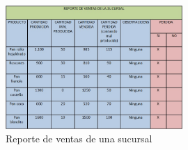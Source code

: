 \begin{figure}[htbp]
	\centering
		\includegraphics[width=0.60\textwidth]{images/REPORTEVENTASSUCURSAL.jpg}
	\caption{Reporte de ventas de una sucursal}
	\label{fig:Reporte de ventas de una sucursal}
\end{figure}%
